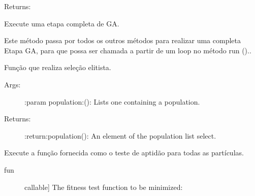 \documentclass[letterpaper,10pt,english]{sphinxmanual}
\begin{document}
\begin{fulllineitems}
\begin{fulllineitems}
\begin{description}
\end{description}

Returns:

\end{fulllineitems}


\begin{fulllineitems}
\label{\detokenize{index:ga.Genetic.do_full_step}}
Execute uma etapa completa de GA.

Este método passa por todos os outros métodos para realizar uma completa
Etapa GA, para que possa ser chamada a partir de um loop no método run ()..

\end{fulllineitems}


\begin{fulllineitems}
\label{\detokenize{index:ga.Genetic.elitism_selection}}
Função que realiza seleção elitista.
\begin{description}
\item[{Args:}] \leavevmode
:param population:(): Lists one containing a population.

\item[{Returns:}] \leavevmode
:return:population(): An element of the population list select.

\end{description}

\end{fulllineitems}


\begin{fulllineitems}
\label{\detokenize{index:ga.Genetic.evaluate_single_fitness_test}}
Execute a função fornecida como o teste de aptidão para todas as partículas.
\begin{description}
\item[{fun}] \leavevmode{[}callable{]}
The fitness test function to be minimized:
\begin{quote}


\end{quote}
\end{description}
\end{fulllineitems}
\end{fulllineitems}
\end{document}

